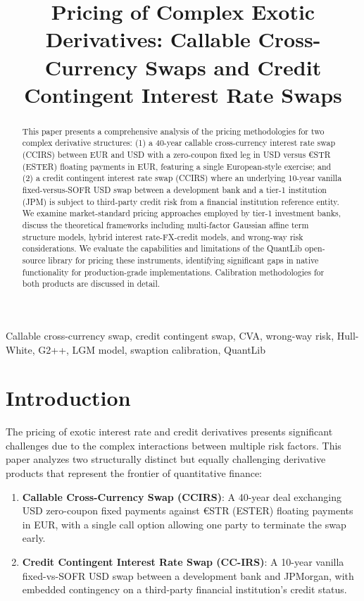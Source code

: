 \documentclass[conference]{IEEEtran}
\title{Pricing of Complex Exotic Derivatives: Callable Cross-Currency Swaps and Credit Contingent Interest Rate Swaps}
\author{\TGIRArticleAuthorBlock}
\theoremstyle{definition}
\begin{document}
\maketitle

\begin{abstract}
This paper presents a comprehensive analysis of the pricing methodologies for two complex derivative structures: (1) a 40-year callable cross-currency interest rate swap (CCIRS) between EUR and USD with a zero-coupon fixed leg in USD versus €STR (ESTER) floating payments in EUR, featuring a single European-style exercise; and (2) a credit contingent interest rate swap (CCIRS) where an underlying 10-year vanilla fixed-versus-SOFR USD swap between a development bank and a tier-1 institution (JPM) is subject to third-party credit risk from a financial institution reference entity. We examine market-standard pricing approaches employed by tier-1 investment banks, discuss the theoretical frameworks including multi-factor Gaussian affine term structure models, hybrid interest rate-FX-credit models, and wrong-way risk considerations. We evaluate the capabilities and limitations of the QuantLib open-source library for pricing these instruments, identifying significant gaps in native functionality for production-grade implementations. Calibration methodologies for both products are discussed in detail.
\end{abstract}

\begin{IEEEkeywords}
Callable cross-currency swap, credit contingent swap, CVA, wrong-way risk,
Hull-White, G2++, LGM model, swaption calibration, QuantLib
\end{IEEEkeywords}

\section{Introduction}

The pricing of exotic interest rate and credit derivatives presents significant challenges due to the complex interactions between multiple risk factors. This paper analyzes two structurally distinct but equally challenging derivative products that represent the frontier of quantitative finance:

\begin{enumerate}
    \item \textbf{Callable Cross-Currency Swap (CCIRS)}: A 40-year deal exchanging USD zero-coupon fixed payments against €STR (ESTER) floating payments in EUR, with a single call option allowing one party to terminate the swap early.

    \item \textbf{Credit Contingent Interest Rate Swap (CC-IRS)}: A 10-year vanilla fixed-vs-SOFR USD swap between a development bank and JPMorgan, with embedded contingency on a third-party financial institution's credit status.
\end{enumerate}
\end{document}
